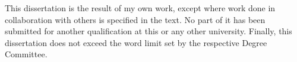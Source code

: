 
\begin{declaration}


This dissertation is the result of my own work, except where work done in collaboration with others is specified in the text. No part of it has been submitted for another qualification at this or any other university. Finally, this dissertation does not exceed the word limit set by the respective Degree Committee. %




\end{declaration}


